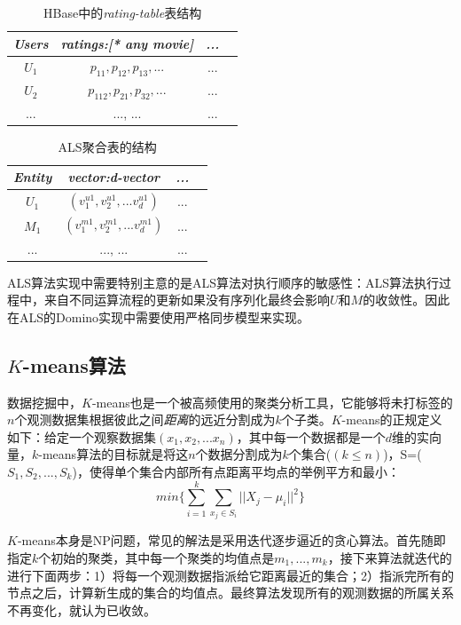 \begin{table}[ht]\small
\caption{HBase中的\textit{rating-table}表结构}
\label{table:rating}
\centering
\begin{tabular}{|c|c|c|c|}
\hline
\textit{Users} & \textit{ratings:[* any movie]} & \textit{...}\\
\hline
$U_1$ &  $p_{11}, p_{12}, p_{13}, ...$ & ...\\
\hline
$U_2$ &  $p_{112}, p_{21}, p_{32}, ...$& ... \\
\hline
... & ..., ... & ... \\
\hline
\end{tabular}
\end{table}


\begin{table}[]\small
\caption{ALS聚合表的结构}
\label{table:aslacc}
\centering
\begin{tabular}{|c|c|c|c|}
\hline
\textit{Entity} & \textit{vector:d-vector} & \textit{...}\\
\hline
$U_1$ &  $\left( v_1^{u1}, v_2^{u1}, ... v_d^{u1} \right)$ & ...\\
\hline
$M_1$ &  $\left( v_1^{m1}, v_2^{m1}, ... v_d^{m1} \right)$ & ... \\
\hline
... & ..., ... & ... \\
\hline
\end{tabular}
\end{table}

ALS算法实现中需要特别主意的是ALS算法对执行顺序的敏感性：ALS算法执行过程中，来自不同运算流程的更新如果没有序列化最终会影响$U$和$M$的收敛性。因此在ALS的Domino实现中需要使用严格同步模型来实现。

\subsection{$K$-means算法}
数据挖掘中，$K$-means也是一个被高频使用的聚类分析工具，它能够将未打标签的$n$个观测数据集根据彼此之间\textit{距离}的远近分割成为$k$个子类。$K$-means的正规定义如下：给定一个观察数据集$\left(x_1,
  x_2, ... x_n\right)$，其中每一个数据都是一个$d$维的实向量，$k$-means算法的目标就是将这$n$个数据分割成为$k$个集合($\left(k \leq n\right)$)，S=($S_1, S_2, ...,
S_k$)，使得单个集合内部所有点距离平均点的举例平方和最小：
\begin{equation}
  min\{\sum\limits_{i=1}^{k} \sum\limits_{x_j \in S_i}^{} ||X_j - \mu_i||^2\}
\end{equation}

$K$-means本身是NP问题，常见的解法是采用迭代逐步逼近的贪心算法。首先随即指定$k$个初始的聚类，其中每一个聚类的均值点是$m_1, ..., m_k$，接下来算法就迭代的进行下面两步：1）将每一个观测数据指派给它距离最近的集合；2）指派完所有的节点之后，计算新生成的集合的均值点。最终算法发现所有的观测数据的所属关系不再变化，就认为已收敛。

